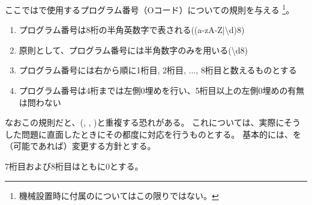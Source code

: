 

ここでは\DMC で使用するプログラム番号（Oコード）についての規則を与える
\footnote{機械設置時に付属の\BundledNCPrg についてはこの限りではない。}。



\begin{enumerate}[label=\Roman*., ref=\Roman*]
\item {}プログラム番号は8桁の半角英数字で表される({\ttfamily(a-zA-Z|\textbackslash d){8}})
\item 原則として、プログラム番号には半角数字のみを用いる({\ttfamily\textbackslash d{8}})
\item {}プログラム番号には右から順に1桁目, 2桁目, ..., 8桁目と数えるものとする
\item\label{item:PNbasicGE4}プログラム番号は4桁までは左側0埋めを行い、5桁目以上の左側0埋めの有無は問わない
\end{enumerate}
\begin{hosoku}
なおこの規則だと、\BundledNCPrg(, , )と重複する恐れがある。
これについては、実際にそうした問題に直面したときにその都度に対応を行うものとする。
基本的には、\BundledNCPrg を（可能であれば）変更する方針とする。
\end{hosoku}


7桁目および8桁目はともに0とする。

